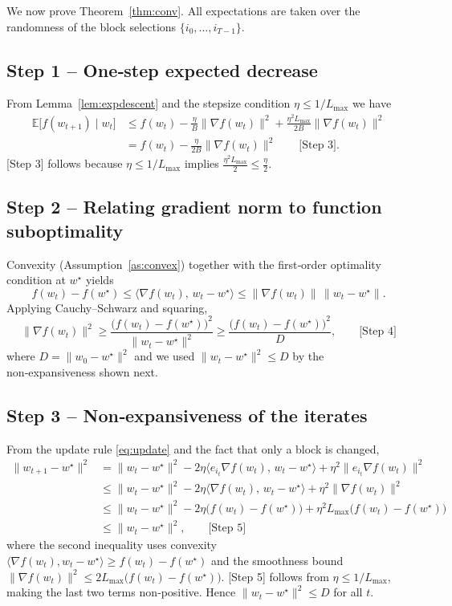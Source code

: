 \documentclass{article}
\newcommand{\E}{\mathbb{E}}
\begin{document}
We now prove Theorem~\ref{thm:conv}.  
All expectations are taken over the randomness of the block selections
$\{i_{0},\dots ,i_{T-1}\}$.

\subsection*{Step 1 – One‑step expected decrease}
From Lemma~\ref{lem:expdescent} and the stepsize condition
$\eta\le 1/L_{\max}$ we have
\begin{align}
\E\!\bigl[f(w_{t+1})\mid w_{t}\bigr]
&\le f(w_{t})-\frac{\eta}{B}\|\nabla f(w_{t})\|^{2}
+\frac{\eta^{2}L_{\max}}{2B}\|\nabla f(w_{t})\|^{2}\nonumber\\
&= f(w_{t})-\frac{\eta}{2B}\|\nabla f(w_{t})\|^{2}
\qquad\text{[Step 3]}.
\end{align}
[Step 3] follows because $\eta\le 1/L_{\max}$ implies
$\frac{\eta^{2}L_{\max}}{2}\le\frac{\eta}{2}$.

\subsection*{Step 2 – Relating gradient norm to function suboptimality}
Convexity (Assumption~\ref{as:convex}) together with the
first‑order optimality condition at $w^{\star}$ yields
\[
f(w_{t})-f(w^{\star})\le\langle\nabla f(w_{t}),\,w_{t}-w^{\star}\rangle
\le \|\nabla f(w_{t})\|\,\|w_{t}-w^{\star}\|.
\]
Applying Cauchy–Schwarz and squaring,
\[
\|\nabla f(w_{t})\|^{2}\ge
\frac{\bigl(f(w_{t})-f(w^{\star})\bigr)^{2}}{\|w_{t}-w^{\star}\|^{2}}
\ge \frac{\bigl(f(w_{t})-f(w^{\star})\bigr)^{2}}{D},
\qquad\text{[Step 4]}
\]
where $D=\|w_{0}-w^{\star}\|^{2}$ and we used $\|w_{t}-w^{\star}\|^{2}\le D$
by the non‑expansiveness shown next.

\subsection*{Step 3 – Non‑expansiveness of the iterates}
From the update rule \eqref{eq:update} and the fact that only a block
is changed,
\[
\begin{aligned}
\|w_{t+1}-w^{\star}\|^{2}
&= \|w_{t}-w^{\star}\|^{2}
-2\eta\langle e_{i_{t}}\nabla f(w_{t}),\,w_{t}-w^{\star}\rangle
+\eta^{2}\|e_{i_{t}}\nabla f(w_{t})\|^{2}\\
&\le \|w_{t}-w^{\star}\|^{2}
-2\eta\langle \nabla f(w_{t}),\,w_{t}-w^{\star}\rangle
+\eta^{2}\|\nabla f(w_{t})\|^{2}\\
&\le \|w_{t}-w^{\star}\|^{2}
-2\eta\bigl(f(w_{t})-f(w^{\star})\bigr)
+\eta^{2}L_{\max}\bigl(f(w_{t})-f(w^{\star})\bigr)\\
&\le \|w_{t}-w^{\star}\|^{2},
\qquad\text{[Step 5]}
\end{aligned}
\]
where the second inequality uses convexity
$\langle \nabla f(w_{t}),w_{t}-w^{\star}\rangle\ge
f(w_{t})-f(w^{\star})$ and the smoothness bound
$\|\nabla f(w_{t})\|^{2}\le 2L_{\max}\bigl(f(w_{t})-f(w^{\star})\bigr)$.
[Step 5] follows from $\eta\le 1/L_{\max}$, making the last two terms
non‑positive. Hence $\|w_{t}-w^{\star}\|^{2}\le D$ for all $t$.
\end{document}
